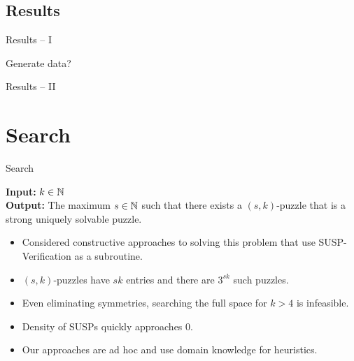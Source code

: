 \documentclass[t,10pt,
mathserif,xcolor=dvipsnames]{beamer}
\begin{document}
\subsection{Results}

\begin{myframe}{Results -- I}

  Generate data?
  
\end{myframe}

\begin{myframe}{Results -- II}

\end{myframe}


\section{Search}


\begin{myframe}{Search}

  \begin{problem}
    \textbf{Input:} $k \in \mathbb{N}$ \\[1ex] \textbf{Output:} The maximum
    $s\in \mathbb{N}$ such that there exists a $(s,k)$-puzzle that is a strong
    uniquely solvable puzzle.
  \end{problem}

  \begin{itemize}
  \item Considered constructive approaches to solving this
    problem that use SUSP-Verification as a subroutine.
  \item $(s,k)$-puzzles have $sk$ entries and there are $3^{sk}$ such puzzles.
  \item Even eliminating symmetries, searching the full space for $k >
    4$ is infeasible.
  \item Density of SUSPs quickly approaches 0.
  \item Our approaches are ad hoc and use domain knowledge for heuristics.
  \end{itemize}

  
\end{myframe}
\end{document}
